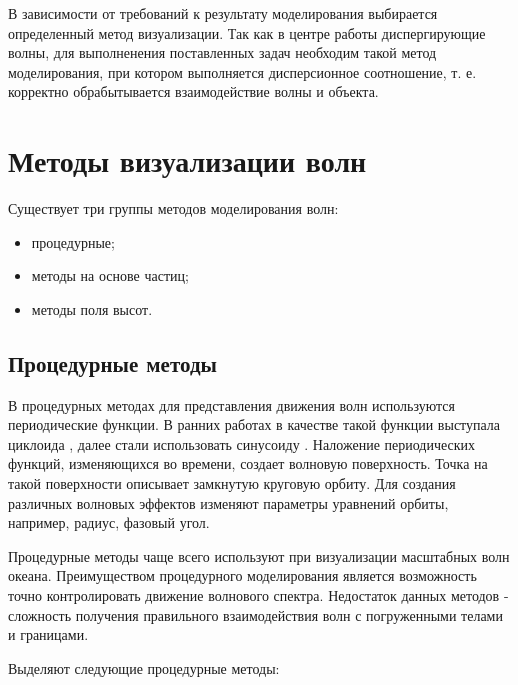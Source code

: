 В зависимости от требований к результату моделирования выбирается определенный метод визуализации. Так как в центре работы диспергирующие волны, для выполненения поставленных задач необходим такой метод моделирования, при котором выполняется дисперсионное соотношение, т. е. корректно обрабытывается взаимодействие волны и объекта.

\section{Методы визуализации волн}

Существует три группы методов моделирования волн:

\begin{itemize}
    \item процедурные;
    \item методы на основе частиц;
    \item методы поля высот.
\end{itemize}

\subsection{Процедурные методы}

В процедурных методах для представления движения волн используются периодические функции. В ранних работах в качестве такой функции выступала циклоида \cite{orbit-procedure}, далее стали использовать синусоиду \cite{spectrum-darles}. Наложение периодических функций, изменяющихся во времени, создает волновую поверхность. Точка на такой поверхности описывает замкнутую круговую орбиту. Для создания различных волновых эффектов изменяют параметры уравнений орбиты, например, радиус, фазовый угол.

Процедурные методы чаще всего используют при визуализации масштабных волн океана. Преимуществом процедурного моделирования является возможность точно контролировать движение волнового спектра. Недостаток данных методов - сложность получения правильного взаимодействия волн с погруженными телами и границами.  

Выделяют следующие процедурные методы:

